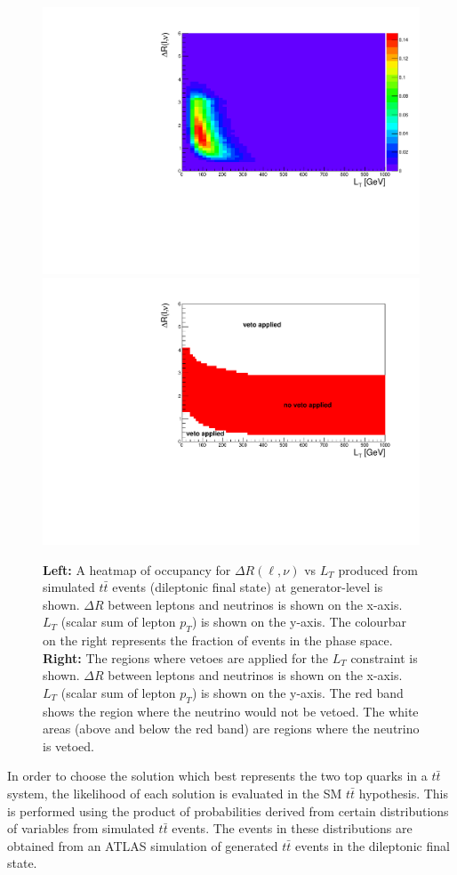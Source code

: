  \begin{figure}[h!]
	\includegraphics[width=0.45\linewidth]{figures/lt_occ_2vSM.pdf}
	\includegraphics[width=0.45\linewidth]{figures/lt_veto_2vSM.pdf}
	\centering
	\caption{\textbf{Left: }A heatmap of occupancy for $\Delta R (\ell, \nu)$ vs $L_{T}$ produced from simulated $t\bar{t}$ events (dileptonic final state) at generator-level is shown. $\Delta R$ between leptons and neutrinos is shown on the x-axis. $L_{T}$ (scalar sum of lepton $p_{T}$) is shown on the y-axis. The colourbar on the right represents the fraction of events in the phase space. \textbf{Right: }The regions where vetoes are applied for the $L_{T}$ constraint is shown. $\Delta R$ between leptons and neutrinos is shown on the x-axis. $L_{T}$ (scalar sum of lepton $p_{T}$) is shown on the y-axis. The red band shows the region where the neutrino would not be vetoed. The white areas (above and below the red band) are regions where the neutrino is vetoed. }
	\label{fig:lt-heatmap}
\end{figure}

In order to choose the solution which best represents the two top quarks in a $t\bar{t}$ system, the likelihood of each solution is evaluated in the SM $t\bar{t}$ hypothesis. This is performed using the product of probabilities derived from certain distributions of variables from simulated $t\bar{t}$ events. The events in these distributions are obtained from an ATLAS simulation of generated $t\bar{t}$ events in the dileptonic final state.\\

